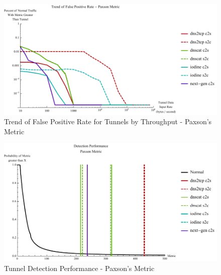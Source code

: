 \documentclass[12pt]{report}
\theoremstyle{remark}
\theoremstyle{definition}
\theoremstyle{definition}
\theoremstyle{definition}
\begin{document}

\begin{figure}
\centering
\includegraphics[width=\textwidth]{../figures/cpplot.pdf}
\caption[Trend of False Positive Rate for Tunnels by Throughput - Paxson's 
Metric]{Trend of False Positive Rate for Tunnels by Throughput - Paxson's 
Metric}
\label{cpplot}
\end{figure}

\begin{figure}
\centering
\includegraphics[width=\textwidth]{../figures/mppv-500.pdf}
\caption[Tunnel Detection Performance - Paxson's Metric]{Tunnel Detection 
Performance - Paxson's Metric}
\label{mppv}
\end{figure}
\end{document}
